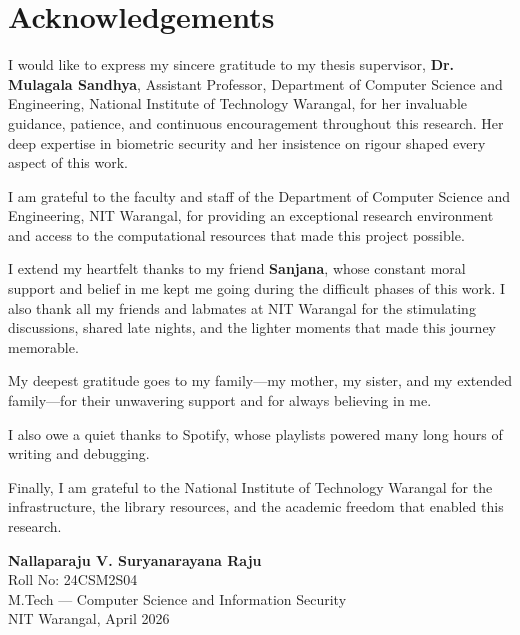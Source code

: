 \chapter*{\center \Large Acknowledgements}

I would like to express my sincere gratitude to my thesis supervisor,
\textbf{Dr. Mulagala Sandhya}, Assistant Professor, Department of Computer Science
and Engineering, National Institute of Technology Warangal, for her invaluable
guidance, patience, and continuous encouragement throughout this research. Her
deep expertise in biometric security and her insistence on rigour shaped every
aspect of this work.

I am grateful to the faculty and staff of the Department of Computer Science and
Engineering, NIT Warangal, for providing an exceptional research environment and
access to the computational resources that made this project possible.

I extend my heartfelt thanks to my friend \textbf{Sanjana}, whose constant moral
support and belief in me kept me going during the difficult phases of this work.
I also thank all my friends and labmates at NIT Warangal for the stimulating
discussions, shared late nights, and the lighter moments that made this journey
memorable.

My deepest gratitude goes to my family---my mother, my sister, and my extended
family---for their unwavering support and for always believing in me.

I also owe a quiet thanks to Spotify, whose playlists powered many long hours of
writing and debugging.

Finally, I am grateful to the National Institute of Technology Warangal for the
infrastructure, the library resources, and the academic freedom that enabled this
research.

\vspace{1.5cm}

\begin{flushright}
\textbf{Nallaparaju V. Suryanarayana Raju} \\
Roll No: 24CSM2S04 \\
M.Tech --- Computer Science and Information Security \\
NIT Warangal, April 2026
\end{flushright}


